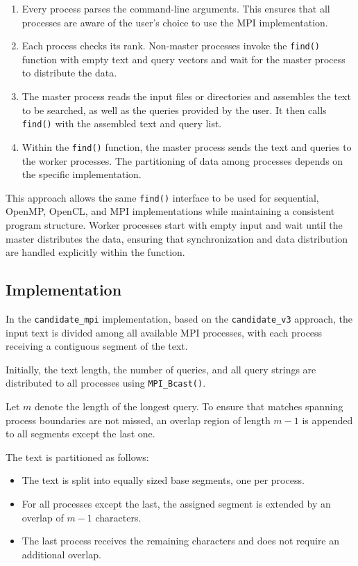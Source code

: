 \documentclass{article}
\begin{document}
    \begin{enumerate}
        \item Every process parses the command-line arguments.
        This ensures that all processes are aware of the user's choice to use the MPI implementation.
        \item Each process checks its rank.
        Non-master processes invoke the \texttt{find()} function with empty text and query vectors and wait for the master process to distribute the data.
        \item The master process reads the input files or directories and assembles the text to be searched, as well as the queries provided by the user.
        It then calls \texttt{find()} with the assembled text and query list.
        \item Within the \texttt{find()} function, the master process sends the text and queries to the worker processes.
        The partitioning of data among processes depends on the specific implementation.
    \end{enumerate}

    This approach allows the same \texttt{find()} interface to be used for sequential, OpenMP, OpenCL, and MPI implementations while maintaining a consistent program structure.
    Worker processes start with empty input and wait until the master distributes the data, ensuring that synchronization and data distribution are handled explicitly within the function.

    \subsection{Implementation}
    In the \texttt{candidate\_mpi} implementation, based on the \texttt{candidate\_v3} approach, the input text is divided among all available MPI processes, with each process receiving a contiguous segment of the text.

    Initially, the text length, the number of queries, and all query strings are distributed to all processes using \texttt{MPI\_Bcast()}.

    Let $m$ denote the length of the longest query.
    To ensure that matches spanning process boundaries are not missed, an overlap region of length $m-1$ is appended to all segments except the last one.

    The text is partitioned as follows:
    \begin{itemize}
        \item The text is split into equally sized base segments, one per process.
        \item For all processes except the last, the assigned segment is extended by an overlap of $m-1$ characters.
        \item The last process receives the remaining characters and does not require an additional overlap.
    \end{itemize}
\end{document}
